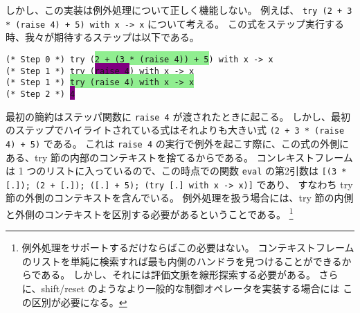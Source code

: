 しかし、この実装は例外処理について正しく機能しない。
例えば、 \texttt{try (2 + 3 * (raise 4) + 5) with x -> x} について考える。
この式をステップ実行する時、我々が期待するステップは以下である。

\vspace{0.2cm}

\noindent \texttt{(* Step 0 *) try (\colorbox{lightgreen}{2 + (3 * (raise 4)) + 5}) with x -> x\\
  (* Step 1 *) try (\colorbox{purple}{raise 4}) with x -> x\\
  (* Step 1 *) \colorbox{lightgreen}{try (raise 4) with x -> x}\\
  (* Step 2 *) \colorbox{purple}{4}\\
}

\vspace{0.2cm}

\noindent 最初の簡約はステッパ関数に \texttt{raise 4} が渡されたときに起こる。
しかし、最初のステップでハイライトされている式はそれよりも大きい式
\texttt{(2 + 3 * (raise 4) + 5)} である。
これは \texttt{raise 4} の実行で例外を起こす際に、この式の外側にある、try 節の内部のコンテキストを捨てるからである。
コンレキストフレームは 1 つのリストに入っているので、この時点での関数 \texttt{eval} の第2引数は
\texttt{[(3 * [.]); (2 + [.]);\ ([.]\ + 5);\ (try [.]\ with x -> x)]} であり、
すなわち try 節の外側のコンテキストを含んでいる。
例外処理を扱う場合には、try 節の内側と外側のコンテキストを区別する必要があるということである。
\footnote{
例外処理をサポートするだけならばこの必要はない。
コンテキストフレームのリストを単純に検索すれば最も内側のハンドラを見つけることができるからである。
しかし、それには評価文脈を線形探索する必要がある。
さらに、shift/reset のようなより一般的な制御オペレータを実装する場合には
この区別が必要になる。
}

